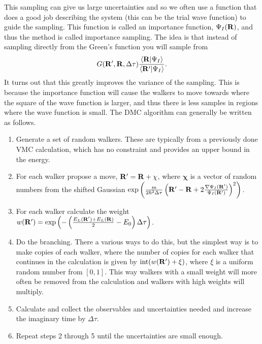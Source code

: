 This sampling can give us large uncertainties and so we often use a function that does a good job describing the system (this can be the trial wave function) to guide the sampling. This function is called an importance function, $\Psi_I(\mathbf{R})$, and thus the method is called importance sampling. The idea is that instead of sampling directly from the Green's function you will sample from
\begin{equation}
   G(\mathbf{R}',\mathbf{R},\Delta\tau)\frac{\left< \mathbf{R} | \Psi_I \right>}{\left< \mathbf{R}' | \Psi_I \right>}.
\end{equation}
It turns out that this greatly improves the variance of the sampling. This is because the importance function will cause the walkers to move towards where the square of the wave function is larger, and thus there is less samples in regions where the wave function is small. The DMC algorithm can generally be written as follows.
\begin{enumerate}
   \item Generate a set of random walkers. These are typically from a previously done VMC calculation, which has no constraint and provides an upper bound in the energy.
   \item For each walker propose a move, $\mathbf{R}' = \mathbf{R} + \mathbf{\chi}$, where $\mathbf{\chi}$ is a vector of random numbers from the shifted Gaussian $\exp\left(\frac{m}{2\hbar^2\Delta\tau}\left(\mathbf{R}'-\mathbf{R}+2\frac{\nabla\Psi_I(\mathbf{R}')}{\Psi_I(\mathbf{R}')}\right)^2\right)$.
   \item For each walker calculate the weight $w(\mathbf{R}')=\exp\left(-\left(\frac{E_L(\mathbf{R}')+E_L(\mathbf{R})}{2}-E_0\right)\Delta\tau\right)$.
   \item Do the branching. There a various ways to do this, but the simplest way is to make copies of each walker, where the number of copies for each walker that continues in the calculation is given by $\mathrm{int}(w(\mathbf{R}')+\xi)$, where $\xi$ is a uniform random number from $[0,1]$. This way walkers with a small weight will more often be removed from the calculation and walkers with high weights will multiply.
   \item Calculate and collect the observables and uncertainties needed and increase the imaginary time by $\Delta\tau$.
   \item Repeat steps 2 through 5 until the uncertainties are small enough.
\end{enumerate}


